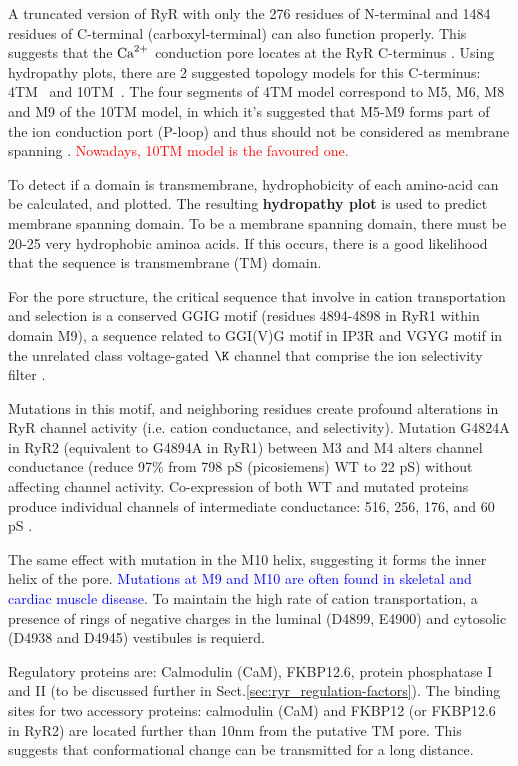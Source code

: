 A truncated version of RyR with only the 276 residues of N-terminal and 1484
residues of C-terminal (carboxyl-terminal) can also function properly. This
suggests that the ${\text{Ca}^{2+}}$ conduction pore locates at the RyR C-terminus
\citep{Bhat1997, xu2000}. Using hydropathy plots, there are 2 suggested topology
models for this C-terminus: 4TM~\citep{Takeshima1989} and
10TM~\citep{Zorzato1990, orlova1996, sharma2000}.
The four segments of 4TM model correspond to M5, M6, M8 and M9 of the 10TM
model, in which it's suggested that M5-M9 forms part of the ion conduction
port (P-loop) and thus should not be considered as membrane spanning
\citep{balshaw1999}. \textcolor{red}{Nowadays, 10TM model is the favoured one.}

\begin{framed}
To detect if a domain is transmembrane, hydrophobicity of each amino-acid can be
calculated, and plotted. The resulting {\bf hydropathy plot} is used to predict
membrane spanning domain. To be a membrane spanning domain, there must be 20-25
very hydrophobic aminoa acids. If  this occurs, there is a good likelihood that
the sequence is transmembrane (TM) domain.
\end{framed}

For the pore structure, the critical sequence that involve in cation
transportation and selection is a conserved GGIG motif (residues 4894-4898 in
RyR1 within domain M9), a sequence related to GGI(V)G motif in IP3R and VGYG
motif in the unrelated class voltage-gated $\K$ channel that comprise the ion
selectivity filter \citep{doyle1998}.

Mutations in this motif, and neighboring residues create profound alterations in
RyR channel activity (i.e. cation conductance, and selectivity). Mutation G4824A
in RyR2 (equivalent to G4894A in RyR1) between M3 and M4 alters channel
conductance (reduce 97\% from 798 pS (picosiemens) WT to 22 pS) without
affecting channel activity. Co-expression of both WT and mutated proteins
produce individual channels of intermediate conductance: 516, 256, 176, and 60
pS \citep{zhao1999}. 

The same effect with mutation in the M10 helix, suggesting it forms the inner
helix of the pore.
\textcolor{blue}{Mutations at M9 and M10 are often found in skeletal and cardiac
muscle disease}. To maintain the high rate of cation transportation, a presence
of rings of negative charges in the luminal (D4899, E4900) and cytosolic (D4938
and D4945) vestibules is requierd.

Regulatory proteins are: Calmodulin (CaM), FKBP12.6, protein phosphatase I and
II (to be discussed further in Sect.\ref{sec:ryr_regulation-factors}). The
binding sites for two accessory proteins: calmodulin (CaM) and FKBP12 (or
FKBP12.6 in RyR2) are located further than 10nm from the putative TM pore. This
suggests that conformational change can be transmitted for a long distance.

